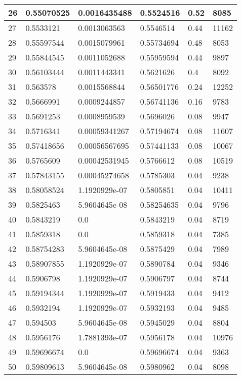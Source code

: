\begin{longtable}{|l|l|l|l|l|l|}
26 & 0.55070525 & 0.0016435488 & 0.5524516 & 0.52 & 8085 \\ \hline 
27 & 0.5533121 & 0.0013063563 & 0.5546514 & 0.44 & 11162 \\ \hline 
28 & 0.55597544 & 0.0015079961 & 0.55734694 & 0.48 & 8053 \\ \hline 
29 & 0.55844545 & 0.0011052688 & 0.55959594 & 0.44 & 9897 \\ \hline 
30 & 0.56103444 & 0.0011443341 & 0.5621626 & 0.4 & 8092 \\ \hline 
31 & 0.563578 & 0.0015568844 & 0.56501776 & 0.24 & 12252 \\ \hline 
32 & 0.5666991 & 0.0009244857 & 0.56741136 & 0.16 & 9783 \\ \hline 
33 & 0.5691253 & 0.0008959539 & 0.5696026 & 0.08 & 9947 \\ \hline 
34 & 0.5716341 & 0.00059341267 & 0.57194674 & 0.08 & 11607 \\ \hline 
35 & 0.57418656 & 0.00056567695 & 0.57441133 & 0.08 & 10067 \\ \hline 
36 & 0.5765609 & 0.00042531945 & 0.5766612 & 0.08 & 10519 \\ \hline 
37 & 0.57843155 & 0.00045274658 & 0.5785303 & 0.04 & 9238 \\ \hline 
38 & 0.58058524 & 1.1920929e-07 & 0.5805851 & 0.04 & 10411 \\ \hline 
39 & 0.5825463 & 5.9604645e-08 & 0.58254635 & 0.04 & 9796 \\ \hline 
40 & 0.5843219 & 0.0 & 0.5843219 & 0.04 & 8719 \\ \hline 
41 & 0.5859318 & 0.0 & 0.5859318 & 0.04 & 7385 \\ \hline 
42 & 0.58754283 & 5.9604645e-08 & 0.5875429 & 0.04 & 7989 \\ \hline 
43 & 0.58907855 & 1.1920929e-07 & 0.5890784 & 0.04 & 9346 \\ \hline 
44 & 0.5906798 & 1.1920929e-07 & 0.5906797 & 0.04 & 8744 \\ \hline 
45 & 0.59194344 & 1.1920929e-07 & 0.5919433 & 0.04 & 9412 \\ \hline 
46 & 0.5932194 & 1.1920929e-07 & 0.5932193 & 0.04 & 9485 \\ \hline 
47 & 0.594503 & 5.9604645e-08 & 0.5945029 & 0.04 & 8804 \\ \hline 
48 & 0.5956176 & 1.7881393e-07 & 0.5956178 & 0.04 & 10976 \\ \hline 
49 & 0.59696674 & 0.0 & 0.59696674 & 0.04 & 9363 \\ \hline 
50 & 0.59809613 & 5.9604645e-08 & 0.5980962 & 0.04 & 8098 \\ \hline 

\end{longtable}

